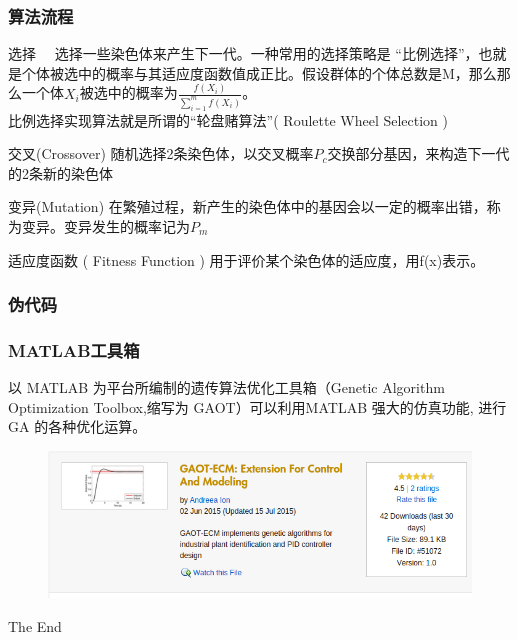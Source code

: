 \documentclass{beamer}
\begin{document}
\begin{spacing}{1.5}
\begin{frame}
		\end{frame}
		\begin{frame}\tiny
			\frametitle{算法流程}
			\begin{block}{选择}
			　选择一些染色体来产生下一代。一种常用的选择策略是 “比例选择”，也就是个体被选中的概率与其适应度函数值成正比。假设群体的个体总数是M，那么那么一个体$X_i$被选中的概率为$\frac{f(X_i)}{\sum\limits_{i=1}^{m}f(X_i)} $。\\比例选择实现算法就是所谓的“轮盘赌算法”( Roulette Wheel Selection )
			\end{block}
			\begin{block}{交叉(Crossover)}
			随机选择2条染色体，以交叉概率$P_c$交换部分基因，来构造下一代的2条新的染色体
			\end{block}
			\begin{block}{变异(Mutation)}
			在繁殖过程，新产生的染色体中的基因会以一定的概率出错，称为变异。变异发生的概率记为$P_m$
			\end{block}
			\begin{block}{适应度函数 ( Fitness Function )}
				用于评价某个染色体的适应度，用f(x)表示。
			\end{block}
		\end{frame}
		\begin{frame}
			\frametitle{伪代码}
		
		\end{frame}
		\begin{frame}\footnotesize
			\frametitle{MATLAB工具箱}
			以 MATLAB 为平台所编制的遗传算法优化工具箱（Genetic Algorithm Optimization Toolbox,缩写为 GAOT）可以利用MATLAB 强大的仿真功能, 进行 GA 的各种优化运算。
			\begin{figure}
			\includegraphics[width=1\linewidth]{GAOT.png}
		\end{figure}
		\end{frame}
		\begin{frame}
			\Huge{\centerline{The End}}
		\end{frame}
\end{spacing}
\end{document}
